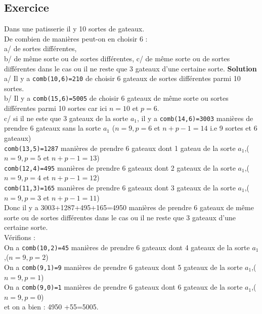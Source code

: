 \documentclass[a4paper,11pt]{book}
\begin{document}
\subsection{Exercice}
Dans une patisserie il y 10 sortes de gateaux.\\
De combien de mani\`eres peut-on en choisir 6 :\\
a/ de sortes diff\'erentes,\\
b/ de m\^eme sorte ou de sortes diff\'erentes,
c/ de m\^eme sorte ou de sortes diff\'erentes dans le cas ou il ne reste que 3 gateaux d'une certaine sorte.
{\bf Solution}\\
a/ Il y a {\tt comb(10,6)=210} de choisir 6 gateaux de sortes diff\'erentes parmi 
10 sortes.\\
b/ Il y a {\tt comb(15,6)=5005} de choisir 6 gateaux de m\^eme sorte ou sortes 
diff\'erentes parmi 10 sortes car ici $n=10$ et $p=6$.\\
c/ si il ne este que 3 gateaux de la sorte $a_1$, il y a 
{\tt comb(14,6)=3003} mani\`eres de prendre 6 gateaux sans la sorte $a_1$ 
($n=9, p=6$ et $n+p-1=14$ i.e 9 sortes et 6 gateaux)\\
{\tt comb(13,5)=1287} mani\`eres de prendre 6 gateaux dont 1 gateau de la sorte 
$a_1$,($n=9, p=5$ et $n+p-1=13$)\\
{\tt comb(12,4)=495} mani\`eres de prendre 6 gateaux dont 2 gateaux de la sorte 
$a_1$,($n=9, p=4$ et $n+p-1=12$)\\
{\tt comb(11,3)=165} mani\`eres de prendre 6 gateaux dont 3 gateaux de la sorte 
$a_1$,($n=9, p=3$ et $n+p-1=11$)\\
Donc il y a 3003+1287+495+165=4950 mani\`eres de prendre 6 gateaux de m\^eme sorte ou de sortes diff\'erentes dans le cas ou il ne reste que 3 gateaux d'une certaine sorte.\\
V\'erifions :\\
On a {\tt comb(10,2)=45} mani\`eres de prendre 6 gateaux dont 4 gateaux de la 
sorte $a_1$,($n=9, p=2$)\\
On a {\tt comb(9,1)=9} mani\`eres de prendre 6 gateaux dont 5 gateaux de la 
sorte $a_1$,($n=9, p=1$)\\
On a {\tt comb(9,0)=1} mani\`eres de prendre 6 gateaux dont 6 gateaux de la 
sorte $a_1$,($n=9, p=0$)\\
et on a bien : 4950 +55=5005.
\end{document}
